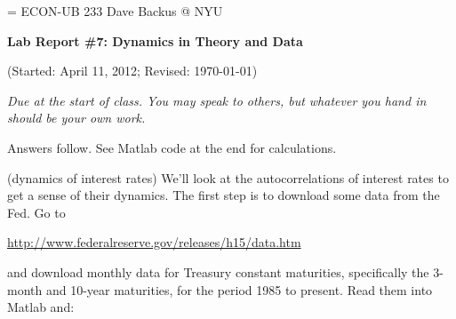 \documentclass[11pt]{exam}
\begin{document}
\parskip=\bigskipamount
\parindent=0.0in
\thispagestyle{empty}
{\large ECON-UB 233 \hfill Dave Backus @ NYU}

\bigskip\bigskip
\centerline{\Large \bf Lab Report \#7:  Dynamics in Theory and Data}
\centerline{(Started: April 11, 2012; Revised: \today)}

\bigskip
{\it Due at the start of class.
You may speak to others, but whatever you hand in should be your own work.}

\begin{questions}

\begin{solution}
Answers follow.  See Matlab code at the end for calculations.
\end{solution}

\question (dynamics of interest rates)
We'll look at the autocorrelations of interest rates to get a sense
of their dynamics.
The first step is to download some data from the Fed.
Go to

\url{http://www.federalreserve.gov/releases/h15/data.htm}

and download monthly data for Treasury constant maturities,
specifically the 3-month and 10-year maturities,
for the period 1985 to present.
Read them into Matlab and:


\end{questions}
\end{document}
